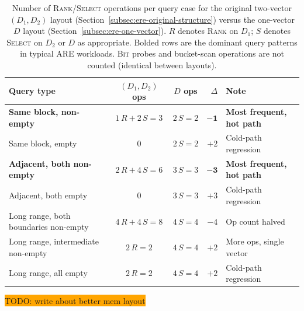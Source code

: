 \begin{table}[H]
    \centering
    \begin{tabular}{@{}lccrl@{}}
        \toprule
        Query type                            & $(D_1, D_2)$ ops  & $D$ ops    & $\Delta$      & Note                             \\
        \midrule
        \textbf{Same block, non-empty}        & $1\,R + 2\,S = 3$ & $2\,S = 2$ & $\mathbf{-1}$ & \textbf{Most frequent, hot path} \\
        Same block, empty                     & $0$               & $2\,S = 2$ & $+2$          & Cold-path regression             \\
        \textbf{Adjacent, both non-empty}     & $2\,R + 4\,S = 6$ & $3\,S = 3$ & $\mathbf{-3}$ & \textbf{Most frequent, hot path} \\
        Adjacent, both empty                  & $0$               & $3\,S = 3$ & $+3$          & Cold-path regression             \\
        Long range, both boundaries non-empty & $4\,R + 4\,S = 8$ & $4\,S = 4$ & $-4$          & Op count halved                  \\
        Long range, intermediate non-empty    & $2\,R = 2$        & $4\,S = 4$ & $+2$          & More ops, single vector          \\
        Long range, all empty                 & $2\,R = 2$        & $4\,S = 4$ & $+2$          & Cold-path regression             \\
        \bottomrule
    \end{tabular}
    \caption{Number of \textsc{Rank}/\textsc{Select} operations per query case for the
    original two-vector $(D_1, D_2)$ layout (Section~\ref{subsec:ere-original-structure})
        versus the one-vector $D$ layout (Section~\ref{subsec:ere-one-vector}).
        $R$ denotes \textsc{Rank} on $D_1$; $S$ denotes \textsc{Select} on $D_2$ or $D$ as
        appropriate. Bolded rows are the dominant query patterns in typical ARE workloads.
        \textsc{Bit} probes and bucket-scan operations are not counted (identical between
        layouts).}
    \label{tab:ere-rank-select}
\end{table}

\colorbox{orange}{TODO: write about better mem layout}

